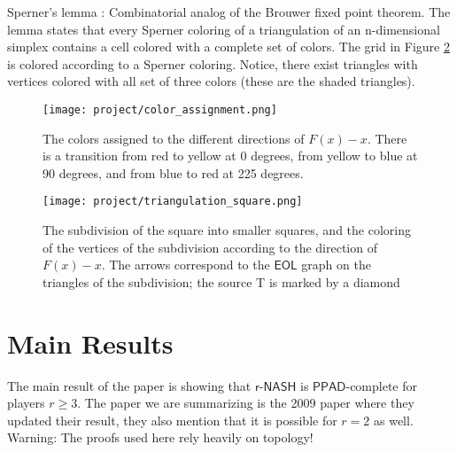 \documentclass[11pt]{article}
\newcommand{\PPADc}{\mathsf{PPAD}\text{-complete}}
\newcommand{\rNASH}{\mathsf{\text{$r$-}NASH}}
\newcommand{\eol}{\mathsf{EOL}}
\begin{document}
\begin{lemma}
    \label{Sperner}
    Sperner's lemma \cite{SpernerNeuerBF}: Combinatorial analog of the Brouwer fixed point theorem. The lemma states that every Sperner coloring of a triangulation of an n-dimensional simplex contains a cell colored with a complete set of colors. The grid in Figure \ref{fig:triangulated} is colored according to a Sperner coloring. Notice, there exist triangles with vertices colored with all set of three colors (these are the shaded triangles).
    
\end{lemma}

\begin{figure}[h!]
    \centering
    \texttt{[image: project/color\_assignment.png]}
    \caption{The colors assigned to the different directions of $F(x)-x$.  There is a transition from red to yellow  at 0 degrees,  from  yellow  to  blue at 90 degrees, and from blue to red at 225 degrees.}
    \label{fig:color_assignment}
\end{figure}

\begin{figure}[h!]
    \centering
    \texttt{[image: project/triangulation\_square.png]}
    \caption{The subdivision of the square into smaller squares, and the coloring of the vertices of the subdivision according to the direction of $F(x) - x$.  The arrows correspond to the $\eol$ graph on the triangles of the subdivision; the source T is marked by a diamond}
    \label{fig:triangulated}
\end{figure}
\newpage
\section{Main Results}

The main result of the paper is showing that $\rNASH$ is $\PPADc$ for players $r \ge 3$. The paper we are summarizing is the 2009 paper where they updated their result, they also mention that it is possible for $r = 2$ as well. Warning: The proofs used here rely heavily on topology!
\end{document}
